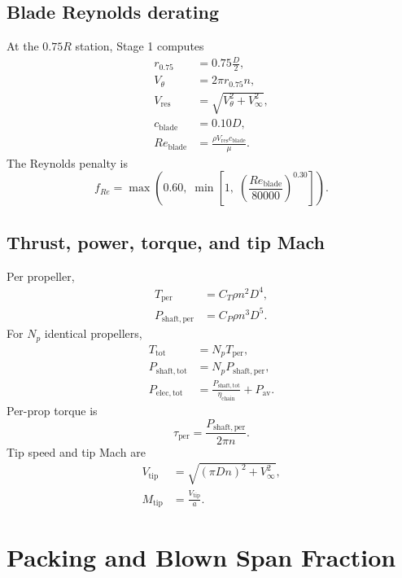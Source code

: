 \documentclass[11pt]{article}
\begin{document}
\subsection{Blade Reynolds derating}

At the \(0.75R\) station, Stage 1 computes
\begin{align}
r_{0.75} &= 0.75 \frac{D}{2}, \\
V_\theta &= 2\pi r_{0.75} n, \\
V_{\mathrm{res}} &= \sqrt{V_\theta^2 + V_\infty^2}, \\
c_{\mathrm{blade}} &= 0.10 D, \\
Re_{\mathrm{blade}} &= \frac{\rho V_{\mathrm{res}} c_{\mathrm{blade}}}{\mu}.
\end{align}
The Reynolds penalty is
\begin{equation}
f_{Re} = \max\left(0.60,\; \min\left[1,\;
\left(\frac{Re_{\mathrm{blade}}}{80000}\right)^{0.30}\right]\right).
\end{equation}

\subsection{Thrust, power, torque, and tip Mach}

Per propeller,
\begin{align}
T_{\mathrm{per}} &= C_T \rho n^2 D^4, \\
P_{\mathrm{shaft,per}} &= C_P \rho n^3 D^5.
\end{align}
For \(N_p\) identical propellers,
\begin{align}
T_{\mathrm{tot}} &= N_p T_{\mathrm{per}}, \\
P_{\mathrm{shaft,tot}} &= N_p P_{\mathrm{shaft,per}}, \\
P_{\mathrm{elec,tot}} &= \frac{P_{\mathrm{shaft,tot}}}{\eta_{\mathrm{chain}}} + P_{\mathrm{av}}.
\end{align}
Per-prop torque is
\begin{equation}
\tau_{\mathrm{per}} = \frac{P_{\mathrm{shaft,per}}}{2\pi n}.
\end{equation}
Tip speed and tip Mach are
\begin{align}
V_{\mathrm{tip}} &= \sqrt{(\pi D n)^2 + V_\infty^2}, \\
M_{\mathrm{tip}} &= \frac{V_{\mathrm{tip}}}{a}.
\end{align}

\section{Packing and Blown Span Fraction}
\end{document}
